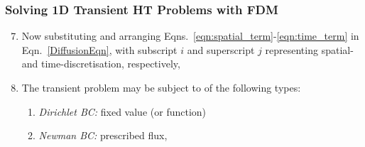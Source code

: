 \documentclass[10pt,compress,unknownkeysallowed]{beamer}
\begin{document}
\begin{frame}
  \frametitle{Solving 1D Transient HT Problems with FDM}
    \begin{enumerate}\setcounter{enumi}{6}
      \item<1-> Now substituting and arranging Eqns.~\ref{eqn:spatial_term}-\ref{eqn:time_term} in Eqn.~\ref{DiffusionEqn}, with subscript $i$ and superscript $j$ representing spatial- and time-discretisation, respectively,
      \item<2-> The transient problem may be subject to  of the following types:
         \begin{enumerate}
            \item<2-> {\it Dirichlet BC:} fixed value (or function)
            \item<3-> {\it Newman BC:} prescribed flux, 
         \end{enumerate}

    \end{enumerate}
\end{frame}
\end{document}
